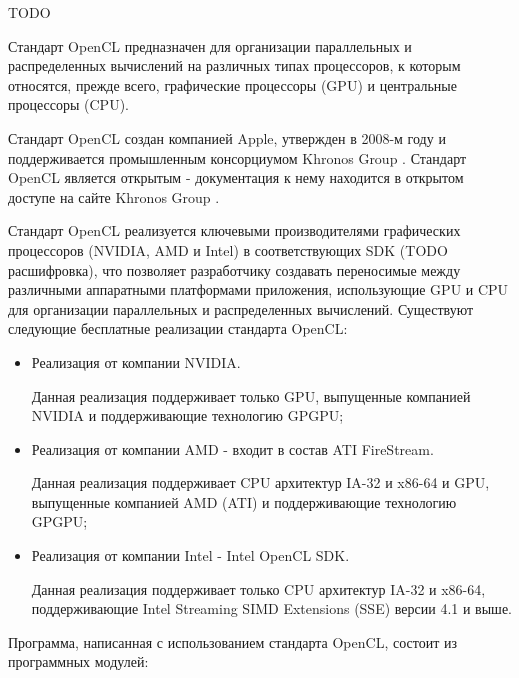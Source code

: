 

	TODO



Стандарт OpenCL предназначен для организации параллельных и распределенных вычислений на различных типах процессоров, к которым относятся, прежде всего, графические процессоры (GPU) и центральные процессоры (CPU).

Стандарт OpenCL создан компанией Apple, утвержден в 2008-м году и поддерживается промышленным консорциумом Khronos Group \cite{khronos}. Стандарт OpenCL является открытым - документация к нему находится в открытом доступе на сайте Khronos Group \cite{opencl}.

Стандарт OpenCL реализуется ключевыми производителями графических процессоров (NVIDIA, AMD и Intel) в соответствующих SDK (TODO расшифровка), что позволяет разработчику создавать переносимые между различными аппаратными платформами приложения, использующие GPU и CPU для организации параллельных и распределенных вычислений. Существуют следующие бесплатные реализации стандарта OpenCL:

\begin{itemize}

	\item Реализация от компании NVIDIA.

		Данная реализация поддерживает только GPU, выпущенные компанией NVIDIA и поддерживающие технологию GPGPU;

	\item Реализация от компании AMD - входит в состав ATI FireStream.

		Данная реализация поддерживает CPU архитектур IA-32 и x86-64 и GPU, выпущенные компанией AMD (ATI) и поддерживающие технологию GPGPU;

	\item Реализация от компании Intel - Intel OpenCL SDK.

		Данная реализация поддерживает только CPU архитектур IA-32 и x86-64, поддерживающие Intel Streaming SIMD Extensions (SSE) версии 4.1 и выше.

\end{itemize}

Программа, написанная с использованием стандарта OpenCL, состоит из программных модулей:

